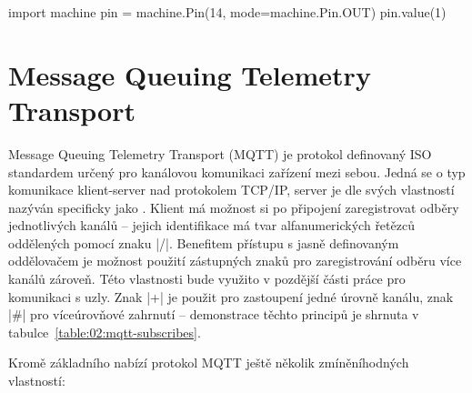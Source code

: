 \begin{code}
    import machine
    pin = machine.Pin(14, mode=machine.Pin.OUT)
    pin.value(1)
\end{code}


\section{Message Queuing Telemetry Transport}\label{sec:message-queuing-telemetry-transport}
Message Queuing Telemetry Transport (MQTT) je protokol definovaný ISO standardem určený pro kanálovou komunikaci zařízení
mezi sebou.
Jedná se o typ komunikace klient-server nad protokolem TCP/IP, server je dle svých vlastností nazýván specificky jako .
Klient má možnost si po připojení zaregistrovat odběry jednotlivých kanálů -- jejich identifikace má tvar
alfanumerických řetězců oddělených pomocí znaku \ic|/|.
Benefitem přístupu s jasně definovaným oddělovačem je možnost použití zástupných znaků pro
zaregistrování odběru více kanálů zároveň.
Této vlastnosti bude využito v pozdější části práce pro komunikaci s uzly. Znak \ic|+|
je použit pro zastoupení jedné úrovně kanálu, znak \ic|#| pro víceúrovňové zahrnutí -- demonstrace těchto principů je shrnuta v
tabulce~\ref{table:02:mqtt-subscribes}.

Kromě základního nabízí protokol MQTT ještě několik zmíněníhodných vlastností:

